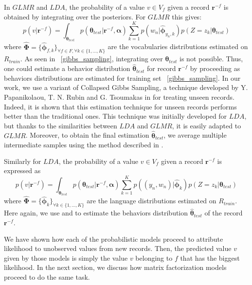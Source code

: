 In $GLMR$ and $LDA$, the probability of a value $v \in V_{f}$ given a record $\mathbf{r}^{-f}$ is obtained by integrating over the posteriors. For $GLMR$ this gives:
\begin{equation}
p(v|\mathbf{r}^{-f})=\int_{\boldsymbol{\theta}_{test} }p(\boldsymbol{\theta}_{test}|\mathbf{r}^{-f},\boldsymbol{\alpha })\sum_{k=1}^{K}p(w_{n}|\boldsymbol{\widehat{\phi}  }_{y_{n},k})p(Z=z_{k}|\boldsymbol{\theta }_{test})
\end{equation}
where $\boldsymbol{\widehat{\Phi }}=\{\boldsymbol{\widehat{\phi} }_{f,k}\}_{\forall f \in F, \forall k\in\{1,...,K\}}$ are the vocabularies distributions estimated on $R_{train}$. As seen in ~\ref{gibbs_sampling}, integrating over $\boldsymbol{\theta}_{test}$ is not possible. Thus, one could estimate a behavior distribution $\boldsymbol{\widehat{\theta}}_{test}$ for record $\mathbf{r}^{-f}$ by proceeding as behaviors distributions are estimated for training set ~\ref{gibbs_sampling}. In our work, we use a variant of Collapsed Gibbs Sampling, a technique developed by Y. Papanikolaou, T. N. Rubin and G. Tsoumakas in \cite{gibbsunseen} for treating unseen records. Indeed, it is shown that this estimation technique for unseen records performs better than the traditional ones. This technique was initially developed for $LDA$, but thanks to the similarities between $LDA$ and $GLMR$, it is easily adapted to $GLMR$. Moreover, to obtain the final estimation $\boldsymbol{\widehat{\theta}}_{test}$, we average multiple intermediate samples using the method described in \cite{gibbsaverage}.

Similarly for $LDA$, the probability of a value $v \in V_{f}$ given a record $\mathbf{r}^{-f}$ is expressed as
\begin{equation}
p(v|\mathbf{r}^{-f})=\int_{\boldsymbol{\theta}_{test} }p(\boldsymbol{\theta}_{test}|\mathbf{r}^{-f},\boldsymbol{\alpha })\sum_{k=1}^{K}p((y_{n},w_{n})|\boldsymbol{\widehat{\phi}  }_{k})p(Z=z_{k}|\boldsymbol{\theta }_{test})
\end{equation}
where $\boldsymbol{\widehat{\Phi }}=\{\boldsymbol{\widehat{\phi} }_{k}\}_{\forall k\in\{1,...,K\}}$ are the language distributions estimated on $R_{train}$. Here again, we use \cite{gibbsunseen} and \cite{gibbsaverage} to estimate the behaviors distribution $\boldsymbol{\widehat{\theta}}_{test}$ of the record $\mathbf{r}^{-f}$. \par

We have shown how each of the probabilistic models proceed to attribute likelihood to unobserved values from new records. Then, the predicted value $v$ given by those models is simply the value $v$ belonging to $f$ that has the biggest likelihood. In the next section, we discuss how matrix factorization models proceed to do the same task.

